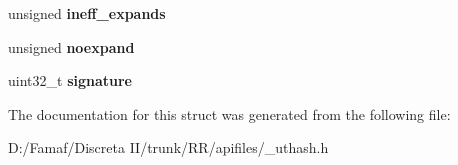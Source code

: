 \begin{DoxyCompactItemize}
\item 
\hypertarget{struct_u_t__hash__table_ad2dea912f78ea416489b0a386ad0daf9}{unsigned {\bfseries ineff\+\_\+expands}}\label{struct_u_t__hash__table_ad2dea912f78ea416489b0a386ad0daf9}

\item 
\hypertarget{struct_u_t__hash__table_a35073018f3ebb189c76eed44ff19899a}{unsigned {\bfseries noexpand}}\label{struct_u_t__hash__table_a35073018f3ebb189c76eed44ff19899a}

\item 
\hypertarget{struct_u_t__hash__table_acd2a6284879dded65f0b8daa7c68485a}{uint32\+\_\+t {\bfseries signature}}\label{struct_u_t__hash__table_acd2a6284879dded65f0b8daa7c68485a}

\end{DoxyCompactItemize}


The documentation for this struct was generated from the following file\+:\begin{DoxyCompactItemize}
\item 
D\+:/\+Famaf/\+Discreta I\+I/trunk/\+R\+R/apifiles/\+\_\+uthash.\+h\end{DoxyCompactItemize}
